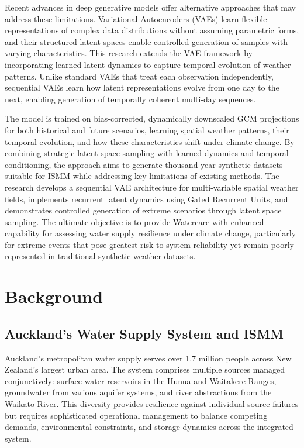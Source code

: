 Recent advances in deep generative models offer alternative approaches that may address these 
limitations. Variational Autoencoders (VAEs) learn flexible representations of complex data 
distributions without assuming parametric forms, and their structured latent spaces enable 
controlled generation of samples with varying characteristics. This research extends the VAE 
framework by incorporating learned latent dynamics to capture temporal evolution of weather 
patterns. Unlike standard VAEs that treat each observation independently, sequential VAEs learn 
how latent representations evolve from one day to the next, enabling generation of temporally 
coherent multi-day sequences.

The model is trained on bias-corrected, dynamically downscaled GCM projections for both 
historical and future scenarios, learning spatial weather patterns, their temporal evolution, 
and how these characteristics shift under climate change. By combining strategic latent space 
sampling with learned dynamics and temporal conditioning, the approach aims to generate 
thousand-year synthetic datasets suitable for ISMM while addressing key limitations of existing 
methods. The research develops a sequential VAE architecture for multi-variable spatial weather 
fields, implements recurrent latent dynamics using Gated Recurrent Units, and demonstrates 
controlled generation of extreme scenarios through latent space sampling. The ultimate 
objective is to provide Watercare with enhanced capability for assessing water supply 
resilience under climate change, particularly for extreme events that pose greatest risk to 
system reliability yet remain poorly represented in traditional synthetic weather datasets.

\chapter{Background}

\section{Auckland's Water Supply System and ISMM}

Auckland's metropolitan water supply serves over 1.7 million people across New Zealand's 
largest urban area. The system comprises multiple sources managed conjunctively: surface water 
reservoirs in the Hunua and Waitakere Ranges, groundwater from various aquifer systems, and 
river abstractions from the Waikato River. This diversity provides resilience against 
individual source failures but requires sophisticated operational management to balance 
competing demands, environmental constraints, and storage dynamics across the integrated system.

